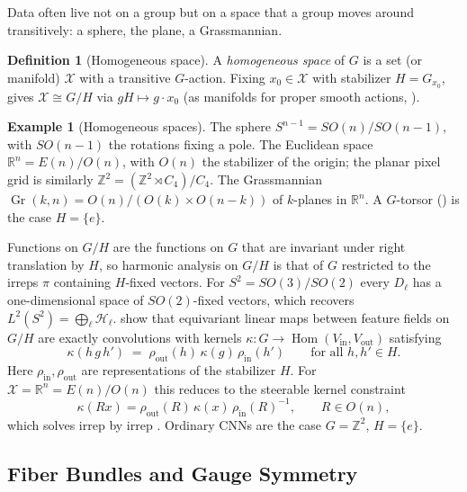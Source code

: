 \documentclass[11pt]{article}
\theoremstyle{plain}
\theoremstyle{definition}
\newtheorem{Definition}{Definition}[section]
\newtheorem{Example}{Example}[section]
\begin{document}
Data often live not on a group but on a space that a group moves around transitively: a sphere, the plane, a Grassmannian.

\begin{Definition}[Homogeneous space]\label{def:homogeneous-space}
A \emph{homogeneous space} of $G$ is a set (or manifold) $\mathcal{X}$ with a transitive $G$-action.
Fixing $x_0\in\mathcal{X}$ with stabilizer $H = G_{x_0}$,  gives $\mathcal{X}\cong G/H$ via $gH\mapsto g\cdot x_0$ (as manifolds for proper smooth actions, ).
\end{Definition}

\begin{Example}[Homogeneous spaces]\label{ex:homogeneous-spaces}
The sphere $S^{n-1} = SO(n)/SO(n-1)$, with $SO(n-1)$ the rotations fixing a pole.
The Euclidean space $\mathbb{R}^n = E(n)/O(n)$, with $O(n)$ the stabilizer of the origin; the planar pixel grid is similarly $\mathbb{Z}^2 = (\mathbb{Z}^2\rtimes C_4)/C_4$.
The Grassmannian $\operatorname{Gr}(k,n) = O(n)/(O(k)\times O(n-k))$ of $k$-planes in $\mathbb{R}^n$.
A $G$-torsor () is the case $H=\{e\}$.
\end{Example}

Functions on $G/H$ are the functions on $G$ that are invariant under right translation by $H$, so harmonic analysis on $G/H$ is that of $G$ restricted to the irreps $\pi$ containing $H$-fixed vectors.
For $S^2 = SO(3)/SO(2)$ every $D_\ell$ has a one-dimensional space of $SO(2)$-fixed vectors, which recovers $L^2(S^2) = \bigoplus_\ell\mathcal{H}_\ell$.
\citet{cohen2019anips} show that equivariant linear maps between feature fields on $G/H$ are exactly convolutions with kernels $\kappa : G\to\operatorname{Hom}(V_{\mathrm{in}},V_{\mathrm{out}})$ satisfying
\[
    \kappa(h\,g\,h') \;=\; \rho_{\mathrm{out}}(h)\,\kappa(g)\,\rho_{\mathrm{in}}(h') \qquad \text{for all } h,h'\in H.
\]
Here $\rho_{\mathrm{in}},\rho_{\mathrm{out}}$ are representations of the stabilizer $H$.
For $\mathcal{X} = \mathbb{R}^n = E(n)/O(n)$ this reduces to the steerable kernel constraint
\[
    \kappa(Rx) = \rho_{\mathrm{out}}(R)\,\kappa(x)\,\rho_{\mathrm{in}}(R)^{-1}, \qquad R\in O(n),
\]
which  solves irrep by irrep \citep{weiler2018anips,weiler2019anips}.
Ordinary CNNs are the case $G = \mathbb{Z}^2$, $H = \{e\}$.


\subsection{Fiber Bundles and Gauge Symmetry}
\label{subsec:manifold-gauge-theory}
\end{document}
